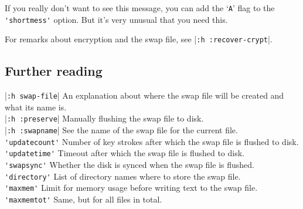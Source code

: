 If you really don't want to see this message, you can add the `\verb!A!' flag to the \verb!'shortmess'! option.
But it's very unusual that you need this.

For remarks about encryption and the swap file, see |\verb!:h :recover-crypt!|.

\subsection{Further reading}
|\verb!:h swap-file!|    An explanation about where the swap file will be created and what its name is. \\
|\verb!:h :preserve!|    Manually flushing the swap file to disk. \\
|\verb!:h :swapname!|    See the name of the swap file for the current file. \\
\verb!'updatecount'!  Number of key strokes after which the swap file is flushed to disk. \\
\verb!'updatetime'!    Timeout after which the swap file is flushed to disk. \\
\verb!'swapsync'!    Whether the disk is synced when the swap file is flushed. \\
\verb!'directory'!  List of directory names where to store the swap file. \\
\verb!'maxmem'!    Limit for memory usage before writing text to the swap file. \\
\verb!'maxmemtot'!  Same, but for all files in total. \\
\clearpage
